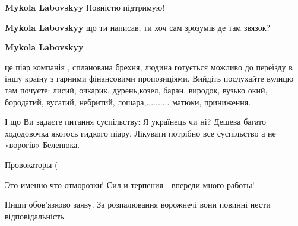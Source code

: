 \begin{itemize}
\begin{itemize}
\textbf{Mykola Labovskyy} Повністю підтримую! 💪🏻

 
\textbf{Mykola Labovskyy} що ти написав, ти хоч сам зрозумів де там звязок?

 
\textbf{Mykola Labovskyy} 

це піар компанія , спланована брехня, людина
готується можливо до переїзду в іншу країну з гарними фінансовими пропозиціями.
Вийдіть послухайте вулицю там почуєте: лисий, очкарик, дурень,козел, баран,
виродок, вузько окий, бородатий, вусатий, небритий, лошара,.......... матюки,
приниження. 

І що Ви задаєте питання суспільству: Я українець чи ні? Дешева
багато хододовочка якогось гидкого піару. Лікувати потрібно все суспільство а
не «ворогів» Беленюка.
\end{itemize}

 
Провокаторы (

 

Это именно что отморозки! Сил и терпения - впереди много работы!

 
Пиши обов'язково заяву. За розпалювання ворожнечі вони повинні нести відповідальність

 

\end{itemize}
